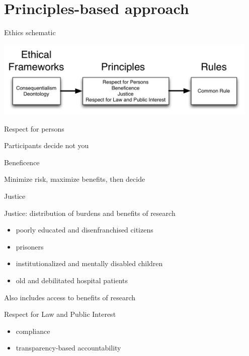 \documentclass{beamer}
\begin{document}
\section{Principles-based approach}
\begin{frame}{Ethics schematic}

\begin{center}
\includegraphics[width=0.95\textwidth]{figures/ethics_schematic_simple.png}
\end{center}

\end{frame}

\begin{frame}{Respect for persons}


Participants decide not you

\end{frame}

\begin{frame}{Beneficence}

Minimize risk, maximize benefits, then decide

\end{frame}

\begin{frame}{Justice}

Justice: distribution of burdens and benefits of research
\begin{itemize}
\item poorly educated and disenfranchised citizens
\item prisoners
\item institutionalized and mentally disabled children
\item old and debilitated hospital patients
\end{itemize}
Also includes access to benefits of research

\end{frame}

\begin{frame}{Respect for Law and Public Interest}

\begin{itemize}
\item compliance
\item transparency-based accountability

\end{itemize}

\end{frame}
\end{document}
